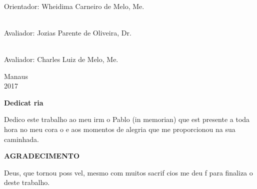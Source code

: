 \documentclass{article}
\begin{document}
\begin{minipage}[l]{14cm}
\begin{center}
\hspace{1cm}\uline{\hspace{10.5cm}} \\
\hspace{1cm}Orientador: Wheidima Carneiro de Melo, Me.

\hspace{1cm}\uline{\hspace{10.5cm}} \\
\hspace{1cm}Avaliador: Jozias Parente de Oliveira, Dr.

\hspace{1cm}\uline{\hspace{10.5cm}} \\
\hspace{1cm}Avaliador: Charles Luiz de Melo, Me.

\end{center}
\end{minipage}

\hspace*{8cm}

\vspace*{\fill}
\begin{center}
Manaus\\2017
\end{center}



\newpage
\thispagestyle{empty}
\begin{flushright}
\begin{minipage}{8cm}
\begin{singlespace}
{\begin{center}\vspace{18cm}\textbf{\normalsize Dedicat ria}\vspace{36pt}\end{center}}
Dedico este trabalho ao meu irm o Pablo (in memorian) que est  presente a toda hora no meu cora o e aos momentos de alegria que me proporcionou na sua caminhada.\\[50pt]
\end{singlespace}
\end{minipage}
\end{flushright}
\newpage
\thispagestyle{empty}
\vspace*{4.5cm}
{\begin{center}\textbf{\normalsize AGRADECIMENTO}\vspace{36pt}\end{center}}
\hspace*{0.8cm}  Deus, que tornou poss vel, mesmo com muitos sacrif cios me deu f  para finaliza o deste trabalho.
\end{document}
